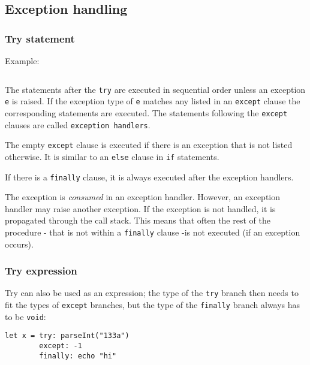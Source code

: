 \hypertarget{exception-handling}{%
\subsection{Exception handling}\label{exception-handling}}

\hypertarget{try-statement}{%
\subsubsection{Try statement}\label{try-statement}}

Example:

\begin{verbatim}
\end{verbatim}

The statements after the \texttt{try} are executed in sequential order
unless an exception \texttt{e} is raised. If the exception type of
\texttt{e} matches any listed in an \texttt{except} clause the
corresponding statements are executed. The statements following the
\texttt{except} clauses are called \texttt{exception\ handlers}.

The empty \texttt{except} clause is executed if there is an exception
that is not listed otherwise. It is similar to an \texttt{else} clause
in \texttt{if} statements.

If there is a \texttt{finally} clause, it is always executed after the
exception handlers.

The exception is \emph{consumed} in an exception handler. However, an
exception handler may raise another exception. If the exception is not
handled, it is propagated through the call stack. This means that often
the rest of the procedure - that is not within a \texttt{finally} clause
-is not executed (if an exception occurs).

\hypertarget{try-expression}{%
\subsubsection{Try expression}\label{try-expression}}

Try can also be used as an expression; the type of the \texttt{try}
branch then needs to fit the types of \texttt{except} branches, but the
type of the \texttt{finally} branch always has to be \texttt{void}:

\begin{verbatim}
let x = try: parseInt("133a")
        except: -1
        finally: echo "hi"
\end{verbatim}

